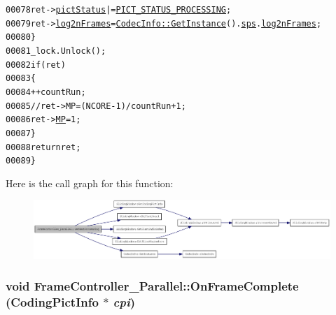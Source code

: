 \begin{footnotesize}
\begin{alltt}
00078                 ret->\hyperlink{struct_coding_pict_info_a41498e5ba764405481005e6569d7f728}{pictStatus} |= \hyperlink{_picture_info_8h_ade32bc4832afeaeeda7d862a70f2d70d}{PICT_STATUS_PROCESSING};
00079                 ret->\hyperlink{struct_coding_pict_info_ac290120f5d65f0497efa17928da82922}{log2nFrames} = \hyperlink{class_codec_info_ad439fd8062a03d868dfe9c9b615b747e}{CodecInfo::GetInstance}().\hyperlink{class_codec_info_aee785011cec77ff3c0c646b498fe1e7d}{sps}.\hyperlink{struct_sequence_parameters_set_ac5f0d82a961acfe4f966e7c35aa37339}{log2nFrames};
00080         \}
00081         \_lock.Unlock();
00082         \textcolor{keywordflow}{if} (ret)
00083         \{
00084                 ++countRun;
00085                 \textcolor{comment}{//ret->MP = (NCORE - 1) / countRun + 1;}
00086                 ret->\hyperlink{struct_coding_pict_info_ab254953ed2b4e1de64f05eadbc825646}{MP} = 1;
00087         \}
00088         \textcolor{keywordflow}{return} ret;
00089 \}
\end{alltt}\end{footnotesize}




Here is the call graph for this function:\nopagebreak
\begin{figure}[H]
\begin{center}
\leavevmode
\includegraphics[width=420pt]{class_frame_controller___parallel_a51792b5fe70db6d99be59c110dbc3041_cgraph}
\end{center}
\end{figure}


\hypertarget{class_frame_controller___parallel_a26429e70ddf3aa68cc2d28000a4935e1}{
\subsubsection[{OnFrameComplete}]{\setlength{\rightskip}{0pt plus 5cm}void FrameController\_\-Parallel::OnFrameComplete ({\bf CodingPictInfo} $\ast$ {\em cpi})}}
\label{class_frame_controller___parallel_a26429e70ddf3aa68cc2d28000a4935e1}


